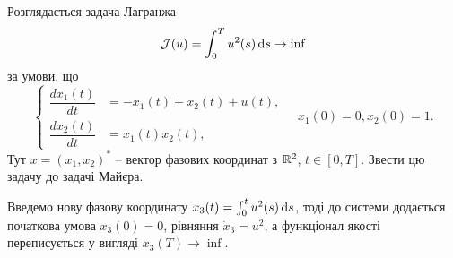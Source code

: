 \begin{problem}
	Розглядається задача Лагранжа
		\[
		\mathcal{J}(u)
		=
		\int_0^T u^2(s) \mathop{}\!\mathrm{d} s \to \inf
		\]
		за умови, що
		\[
			\left\{
				\begin{aligned}
					\dfrac{dx_1(t)}{dt} &= -x_1(t) + x_2(t) + u(t), \\
					\dfrac{dx_2(t)}{dt} &= x_1(t)x_2(t),
				\end{aligned}
			\right.
			\quad
			x_1(0)=0,x_2(0)=1.
		\]
		Тут $x=(x_1,x_2)^*$ -- вектор фазових координат з $\mathbb{R}^2$, $t\in[0,T]$. Звести цю задачу до задачі Майєра.
\end{problem}

\begin{solution}
	Введемо нову фазову координату $x_3(t)=\int_0^t u^2(s) \mathop{}\!\mathrm{d} s$, тоді до системи додається початкова умова $x_3(0)=0$, рівняння $\dot x_3 = u^2$, а функціонал якості переписується у вигляді $x_3(T) \to \inf$.
\end{solution}


\begin{problem}
\end{problem}

\begin{solution}
\end{solution}
